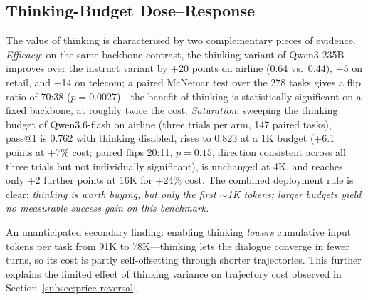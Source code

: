 \documentclass[preprint,authoryear,12pt]{elsarticle}
\begin{document}
\subsection{Thinking-Budget Dose--Response}
\label{subsec:dose-response}
The value of thinking is characterized by two complementary pieces of evidence. \emph{Efficacy}: on the same-backbone contrast, the thinking variant of Qwen3-235B improves over the instruct variant by +20 points on airline (0.64 vs.\ 0.44), +5 on retail, and +14 on telecom; a paired McNemar test over the 278 tasks gives a flip ratio of 70:38 ($p=0.0027$)---the benefit of thinking is statistically significant on a fixed backbone, at roughly twice the cost. \emph{Saturation}: sweeping the thinking budget of Qwen3.6-flash on airline (three trials per arm, 147 paired tasks), pass@1 is 0.762 with thinking disabled, rises to 0.823 at a 1K budget (+6.1 points at +7\% cost; paired flips 20:11, $p=0.15$, direction consistent across all three trials but not individually significant), is unchanged at 4K, and reaches only +2 further points at 16K for +24\% cost. The combined deployment rule is clear: \emph{thinking is worth buying, but only the first ${\sim}$1K tokens; larger budgets yield no measurable success gain on this benchmark}.

An unanticipated secondary finding: enabling thinking \emph{lowers} cumulative input tokens per task from 91K to 78K---thinking lets the dialogue converge in fewer turns, so its cost is partly self-offsetting through shorter trajectories. This further explains the limited effect of thinking variance on trajectory cost observed in Section~\ref{subsec:price-reversal}.
\end{document}
